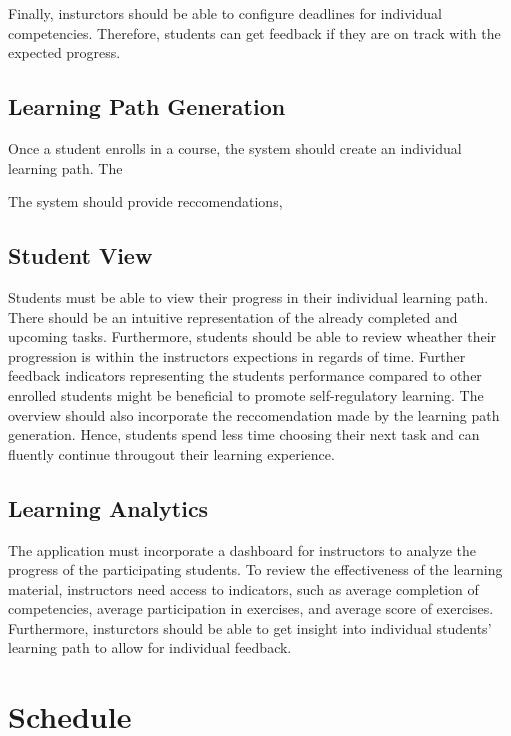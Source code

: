\documentclass[a4paper,12pt,twoside]{article}
\begin{document}
Finally, insturctors should be able to configure deadlines for individual competencies. Therefore, students can get feedback if they are on track with the
expected progress.

\subsection{Learning Path Generation}
Once a student enrolls in a course, the system should create an individual learning path. The

The system should provide reccomendations,

\subsection{Student View}
Students must be able to view their progress in their individual learning path. There should be an intuitive representation of the already completed and upcoming tasks.
Furthermore, students should be able to review wheather their progression is within the instructors expections in regards of time. Further feedback indicators
representing the students performance compared to other enrolled students might be beneficial to promote self-regulatory learning.
The overview should also incorporate the reccomendation made by the learning path generation. Hence, students spend less time choosing their next task and can fluently
continue througout their learning experience.

\subsection{Learning Analytics}
The application must incorporate a dashboard for instructors to analyze the progress of the participating students. To review the effectiveness of the learning material,
instructors need access to indicators, such as average completion of competencies, average participation in exercises, and average score of exercises.
Furthermore, insturctors should be able to get insight into individual students' learning path to allow for individual feedback.


\section{Schedule}
\end{document}
